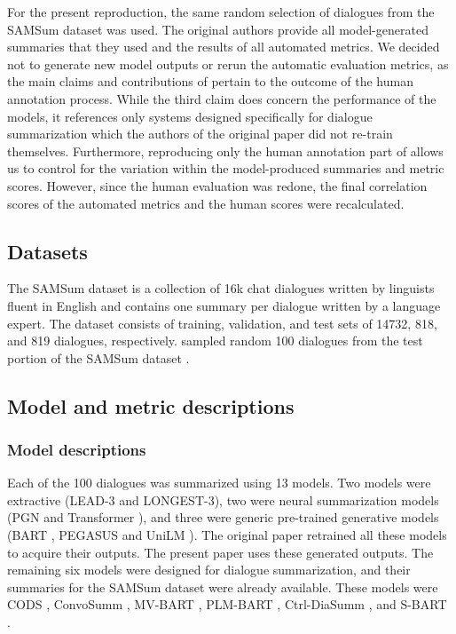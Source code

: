 For the present reproduction, the same random selection of dialogues from the SAMSum dataset was used. The original authors provide all model-generated summaries that they used and the results of all automated metrics. We decided not to generate new model outputs or rerun the automatic evaluation metrics, as the main claims and contributions of \citet{gao2022dialsummeval} pertain to the outcome of the human annotation process. While the third claim does concern the performance of the models, it references only systems designed specifically for dialogue summarization which the authors of the original paper did not re-train themselves. Furthermore, reproducing only the human annotation part of \citet{gao2022dialsummeval} allows us to control for the variation within the model-produced summaries and metric scores. However, since the human evaluation was redone, the final correlation scores of the automated metrics and the human scores were recalculated.

\subsection{Datasets}
The SAMSum dataset is a collection of 16k chat dialogues written by linguists fluent in English and contains one summary per dialogue written by a language expert. The dataset consists of training, validation, and test sets of 14732, 818, and 819 dialogues, respectively. \citet{gao2022dialsummeval} sampled random 100 dialogues from the test portion of the SAMSum dataset \cite{gliwa2019samsum}. 

\subsection{Model and metric descriptions}
\subsubsection{Model descriptions} 
\label{models}
Each of the 100 dialogues was summarized using 13 models. Two models were extractive (LEAD-3 and LONGEST-3), two were neural summarization models (PGN \cite{see2017get} and Transformer \cite{vaswani2017attention}), and three were generic pre-trained generative models (BART \cite{lewis2019bart}, PEGASUS \cite{zhang2020pegasus} and UniLM \cite{dong2019unified}). The original paper retrained all these models to acquire their outputs. The present paper uses these generated outputs. 
The remaining six models were designed for dialogue summarization, and their summaries for the SAMSum dataset were already available. These models were CODS \cite{wu2021controllable}, ConvoSumm \cite{fabbri2021convosumm}, MV-BART \cite{chen2020multi}, PLM-BART \cite{feng2021language}, Ctrl-DiaSumm \cite{liu2021controllable}, and S-BART \cite{chen2021structure}. 

